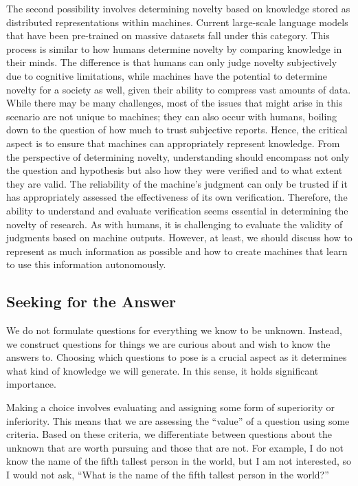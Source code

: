 \documentclass{book}
\begin{document}
The second possibility involves determining novelty based on knowledge stored as distributed representations within machines. Current large-scale language models that have been pre-trained on massive datasets fall under this category. This process is similar to how humans determine novelty by comparing knowledge in their minds. The difference is that humans can only judge novelty subjectively due to cognitive limitations, while machines have the potential to determine novelty for a society as well, given their ability to compress vast amounts of data. While there may be many challenges, most of the issues that might arise in this scenario are not unique to machines; they can also occur with humans, boiling down to the question of how much to trust subjective reports. Hence, the critical aspect is to ensure that machines can appropriately represent knowledge. From the perspective of determining novelty, understanding should encompass not only the question and hypothesis but also how they were verified and to what extent they are valid. The reliability of the machine's judgment can only be trusted if it has appropriately assessed the effectiveness of its own verification. Therefore, the ability to understand and evaluate verification seems essential in determining the novelty of research. As with humans, it is challenging to evaluate the validity of judgments based on machine outputs. However, at least, we should discuss how to represent as much information as possible and how to create machines that learn to use this information autonomously.

\subsection{Seeking for the Answer}
We do not formulate questions for everything we know to be unknown. Instead, we construct questions for things we are curious about and wish to know the answers to. Choosing which questions to pose is a crucial aspect as it determines what kind of knowledge we will generate. In this sense, it holds significant importance. 

Making a choice involves evaluating and assigning some form of superiority or inferiority. This means that we are assessing the ``value'' of a question using some criteria. Based on these criteria, we differentiate between questions about the unknown that are worth pursuing and those that are not. For example, I do not know the name of the fifth tallest person in the world, but I am not interested, so I would not ask, ``What is the name of the fifth tallest person in the world?'' 
\end{document}
